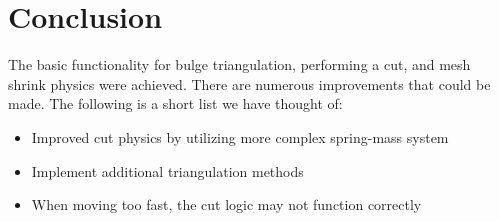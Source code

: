 \documentclass[letterpaper,10pt]{IEEEtran}
\begin{document}
 \section{Conclusion}
 The basic functionality for bulge triangulation, performing a cut, and mesh shrink physics were achieved. 
There are numerous improvements that could be made.  The following is a short list we have thought of:
 \begin{multicols}{2}
\begin{itemize}
\setlength\multicolsep{0pt}
\itemsep0em
\item Improved cut physics by utilizing more complex spring-mass system
\item Implement additional triangulation methods
\item When moving too fast, the cut logic may not function correctly
\end{itemize}
\end{multicols}





%
\end{document}
